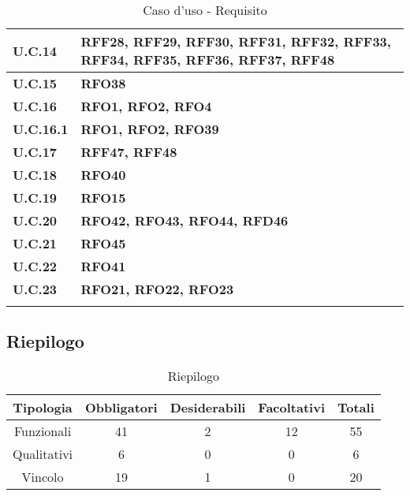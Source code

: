 \begin{longtable}{|>{\centering\arraybackslash}m{}|>{\centering\arraybackslash}m{}|}
	\textbf{U.C.14} & \textbf{RFF28, RFF29, RFF30, RFF31, RFF32, RFF33, RFF34, RFF35, RFF36, RFF37, RFF48} \\\hline
	\textbf{U.C.15} & \textbf{RFO38} \\\hline
	\textbf{U.C.16} & \textbf{RFO1, RFO2, RFO4} \\\hline
	\textbf{U.C.16.1} & \textbf{RFO1, RFO2, RFO39} \\\hline
	\textbf{U.C.17} & \textbf{RFF47, RFF48} \\\hline
	\textbf{U.C.18} & \textbf{RFO40} \\\hline
	\textbf{U.C.19} & \textbf{RFO15} \\\hline
	\textbf{U.C.20} & \textbf{RFO42, RFO43, RFO44, RFD46} \\\hline
	\textbf{U.C.21} & \textbf{RFO45} \\\hline
	\textbf{U.C.22} & \textbf{RFO41} \\\hline
	\textbf{U.C.23} & \textbf{RFO21, RFO22, RFO23} \\\hline
	\caption{Caso d'uso - Requisito}
\end{longtable}
\newpage
\subsection{Riepilogo}
\begin{table}[h]
    \centering
    \renewcommand{\arraystretch}{1.2}
    \setlength{\tabcolsep}{5pt}
    \begin{tabular}{|c|c|c|c|c|}
		\hline
		\textbf{Tipologia} & \textbf{Obbligatori} & \textbf{Desiderabili} & \textbf{Facoltativi} & \textbf{Totali} \\
		\hline
		Funzionali & 41 & 2 & 12 & 55 \\
		\hline
		Qualitativi & 6 & 0 & 0 & 6 \\
		\hline
		Vincolo & 19 & 1 & 0 & 20 \\
		\hline
    \end{tabular}
	\caption{Riepilogo}
\end{table}